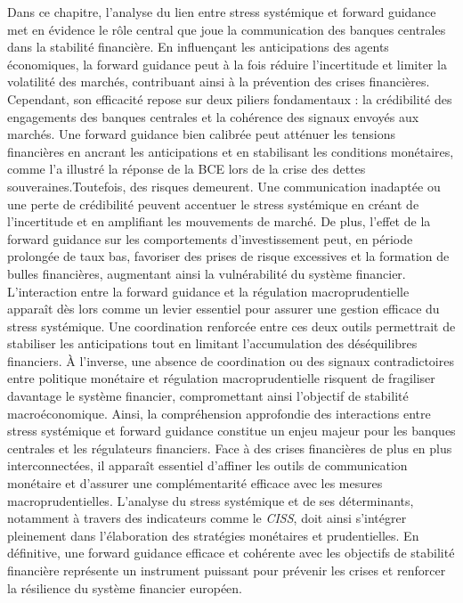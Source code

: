 \newpage

Dans ce chapitre, l'analyse du lien entre stress systémique et forward guidance met en évidence le rôle central que joue la communication des banques centrales dans la stabilité financière. En influençant les anticipations des agents économiques, la forward guidance peut à la fois réduire l’incertitude et limiter la volatilité des marchés, contribuant ainsi à la prévention des crises financières. Cependant, son efficacité repose sur deux piliers fondamentaux : la crédibilité des engagements des banques centrales et la cohérence des signaux envoyés aux marchés. Une forward guidance bien calibrée peut atténuer les tensions financières en ancrant les anticipations et en stabilisant les conditions monétaires, comme l’a illustré la réponse de la BCE lors de la crise des dettes souveraines.Toutefois, des risques demeurent. Une communication inadaptée ou une perte de crédibilité peuvent accentuer le stress systémique en créant de l’incertitude et en amplifiant les mouvements de marché. De plus, l’effet de la forward guidance sur les comportements d’investissement peut, en période prolongée de taux bas, favoriser des prises de risque excessives et la formation de bulles financières, augmentant ainsi la vulnérabilité du système financier.\\

L’interaction entre la forward guidance et la régulation macroprudentielle apparaît dès lors comme un levier essentiel pour assurer une gestion efficace du stress systémique. Une coordination renforcée entre ces deux outils permettrait de stabiliser les anticipations tout en limitant l’accumulation des déséquilibres financiers. À l’inverse, une absence de coordination ou des signaux contradictoires entre politique monétaire et régulation macroprudentielle risquent de fragiliser davantage le système financier, compromettant ainsi l’objectif de stabilité macroéconomique. Ainsi, la compréhension approfondie des interactions entre stress systémique et forward guidance constitue un enjeu majeur pour les banques centrales et les régulateurs financiers. Face à des crises financières de plus en plus interconnectées, il apparaît essentiel d’affiner les outils de communication monétaire et d’assurer une complémentarité efficace avec les mesures macroprudentielles. L’analyse du stress systémique et de ses déterminants, notamment à travers des indicateurs comme le \textit{CISS}, doit ainsi s’intégrer pleinement dans l’élaboration des stratégies monétaires et prudentielles. En définitive, une forward guidance efficace et cohérente avec les objectifs de stabilité financière représente un instrument puissant pour prévenir les crises et renforcer la résilience du système financier européen.\\

